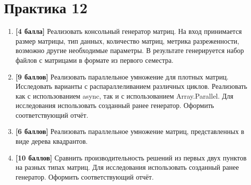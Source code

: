 \section{Практика 12}

\begin{enumerate}

    \item \textbf{[4 балла]} Реализовать консольный генератор матриц. На вход принимается размер матрицы, тип данных, количество матриц, метрика разреженности, возможно другие необходимые параметры. В результате генерируется набор файлов с матрицами в формате из первого семестра. 
    \item \textbf{[9 баллов]} Реализовать параллельное умножение для плотных матриц. Исследовать варианты с распараллеливанием различных циклов. Реализовать как с использованием async, так и с использованием Array.Parallel. Для исследования использовать созданный ранее генератор. Оформить соответствующий отчёт.
    \item \textbf{[6 баллов]} Реализовать параллельное умножение матриц, представленных в виде дерева квадрантов.
    \item \textbf{[10 баллов]} Сравнить производительность решений из первых двух пунктов на разных типах матриц. Для исследования использовать созданный ранее генератор. Оформить соответствующий отчёт. 
    
\end{enumerate}

